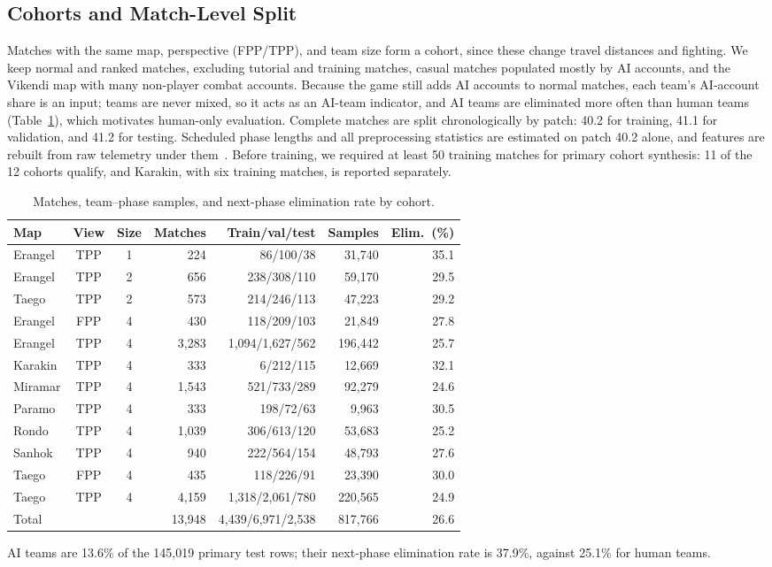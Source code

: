 \documentclass[sigconf,anonymous]{acmart}
\begin{document}
\subsection{Cohorts and Match-Level Split}
\label{sec:method:cohort}
Matches with the same map, perspective (FPP/TPP), and team size form a cohort, since these change travel distances and fighting. We keep normal and ranked matches, excluding tutorial and training matches, casual matches populated mostly by AI accounts, and the Vikendi map with many non-player combat accounts. Because the game still adds AI accounts to normal matches, each team's AI-account share is an input; teams are never mixed, so it acts as an AI-team indicator, and AI teams are eliminated more often than human teams (Table~\ref{tab:cohorts}), which motivates human-only evaluation. Complete matches are split chronologically by patch: 40.2 for training, 41.1 for validation, and 41.2 for testing. Scheduled phase lengths and all preprocessing statistics are estimated on patch 40.2 alone, and features are rebuilt from raw telemetry under them~\cite{Kaufman12}. Before training, we required at least 50 training matches for primary cohort synthesis: 11 of the 12 cohorts qualify, and Karakin, with six training matches, is reported separately.

\begin{table}[t]
\centering
\caption{Matches, team--phase samples, and next-phase elimination rate by cohort.}
\label{tab:cohorts}
\footnotesize
\setlength{\tabcolsep}{2.7pt}
\begin{tabular}{lccrrrr}
\hline
Map & View & Size & Matches & Train/val/test & Samples & Elim.\ (\%) \\
\hline
Erangel & TPP & 1 & 224 & 86/100/38 & 31,740 & 35.1 \\
Erangel & TPP & 2 & 656 & 238/308/110 & 59,170 & 29.5 \\
Taego & TPP & 2 & 573 & 214/246/113 & 47,223 & 29.2 \\
Erangel & FPP & 4 & 430 & 118/209/103 & 21,849 & 27.8 \\
Erangel & TPP & 4 & 3,283 & 1,094/1,627/562 & 196,442 & 25.7 \\
Karakin & TPP & 4 & 333 & 6/212/115 & 12,669 & 32.1 \\
Miramar & TPP & 4 & 1,543 & 521/733/289 & 92,279 & 24.6 \\
Paramo & TPP & 4 & 333 & 198/72/63 & 9,963 & 30.5 \\
Rondo & TPP & 4 & 1,039 & 306/613/120 & 53,683 & 25.2 \\
Sanhok & TPP & 4 & 940 & 222/564/154 & 48,793 & 27.6 \\
Taego & FPP & 4 & 435 & 118/226/91 & 23,390 & 30.0 \\
Taego & TPP & 4 & 4,159 & 1,318/2,061/780 & 220,565 & 24.9 \\
\hline
Total & & & 13,948 & 4,439/6,971/2,538 & 817,766 & 26.6 \\
\hline
\end{tabular}
\smallskip
\parbox{\columnwidth}{\scriptsize AI teams are 13.6\% of the 145,019 primary test rows; their next-phase elimination rate is 37.9\%, against 25.1\% for human teams.}
\end{table}
\end{document}

